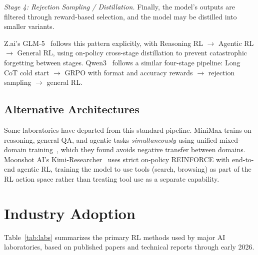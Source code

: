\documentclass[12pt]{article}
\begin{document}
\textit{Stage 4: Rejection Sampling / Distillation.} Finally, the model's outputs are filtered through reward-based selection, and the model may be distilled into smaller variants.

Z.ai's GLM-5~\cite{GLM2025GLM5} follows this pattern explicitly, with Reasoning RL $\rightarrow$ Agentic RL $\rightarrow$ General RL, using on-policy cross-stage distillation to prevent catastrophic forgetting between stages. Qwen3~\cite{Qwen2025Qwen3} follows a similar four-stage pipeline: Long CoT cold start $\rightarrow$ GRPO with format and accuracy rewards $\rightarrow$ rejection sampling $\rightarrow$ general RL.

\subsection{Alternative Architectures}

Some laboratories have departed from this standard pipeline. MiniMax trains on reasoning, general QA, and agentic tasks \textit{simultaneously} using unified mixed-domain training~\cite{MiniMax2025Forge}, which they found avoids negative transfer between domains. Moonshot AI's Kimi-Researcher~\cite{Kimi2025Researcher} uses strict on-policy REINFORCE with end-to-end agentic RL, training the model to use tools (search, browsing) as part of the RL action space rather than treating tool use as a separate capability.


\section{Industry Adoption}

Table~\ref{tab:labs} summarizes the primary RL methods used by major AI laboratories, based on published papers and technical reports through early 2026.
\end{document}
